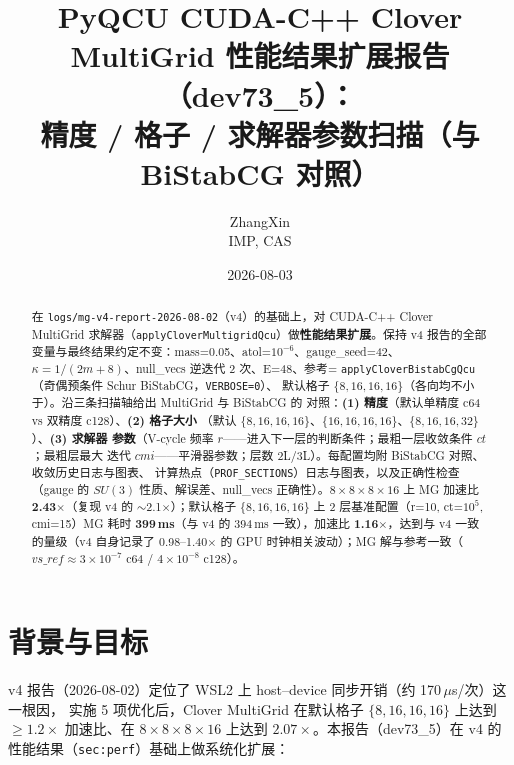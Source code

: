 \documentclass[11pt,a4paper]{article}
\title{\textbf{PyQCU CUDA-C++ Clover MultiGrid 性能结果扩展报告（dev73\_5）：\\
精度 / 格子 / 求解器参数扫描（与 BiStabCG 对照）}}
\author{ZhangXin \\ IMP, CAS}
\date{2026-08-03}
\begin{document}
\maketitle

\begin{abstract}
在 \texttt{logs/mg-v4-report-2026-08-02}（v4）的基础上，对 CUDA-C++ Clover MultiGrid
求解器（\texttt{applyCloverMultigridQcu}）做\textbf{性能结果扩展}。保持 v4 报告的全部
变量与最终结果约定不变：mass=0.05、atol=$10^{-6}$、gauge\_seed=42、
$\kappa=1/(2m+8)$、null\_vecs 逆迭代 2 次、E=48、参考=
\texttt{applyCloverBistabCgQcu}（奇偶预条件 Schur BiStabCG，\texttt{VERBOSE=0}）、
默认格子 $\{8,16,16,16\}$（各向均不小于）。沿三条扫描轴给出 MultiGrid 与 BiStabCG 的
对照：\textbf{(1) 精度}（默认单精度 c64 vs 双精度 c128）、\textbf{(2) 格子大小}
（默认 $\{8,16,16,16\}$、$\{16,16,16,16\}$、$\{8,16,16,32\}$）、\textbf{(3) 求解器
参数}（V-cycle 频率 $r$——进入下一层的判断条件；最粗一层收敛条件 $ct$；最粗层最大
迭代 $cmi$——平滑器参数；层数 2L/3L）。每配置均附 BiStabCG 对照、收敛历史日志与图表、
计算热点（\texttt{PROF\_SECTIONS}）日志与图表，以及正确性检查（gauge 的 $SU(3)$
性质、解误差、null\_vecs 正确性）。$8\times8\times8\times16$ 上 MG 加速比
\textbf{2.43$\times$}（复现 v4 的 $\sim$2.1$\times$）；默认格子 $\{8,16,16,16\}$ 上
2 层基准配置（r=10, ct=$10^5$, cmi=15）MG 耗时 \textbf{399\,ms}（与 v4 的 394\,ms
一致），加速比 \textbf{1.16$\times$}，达到与 v4 一致的量级（v4 自身记录了
0.98--1.40$\times$ 的 GPU 时钟相关波动）；MG 解与参考一致（$vs\_ref\approx3\times10^{-7}$
c64 / $4\times10^{-8}$ c128）。
\end{abstract}

\tableofcontents

\section{背景与目标}
\label{sec:bg}

v4 报告（2026-08-02）定位了 WSL2 上 host--device 同步开销（约 170\,$\mu$s/次）这一根因，
实施 5 项优化后，Clover MultiGrid 在默认格子 $\{8,16,16,16\}$ 上达到 $\ge 1.2\times$
加速比、在 $8\times8\times8\times16$ 上达到 $2.07\times$。本报告（dev73\_5）在 v4 的
性能结果（\texttt{sec:perf}）基础上做系统化扩展：
\end{document}
